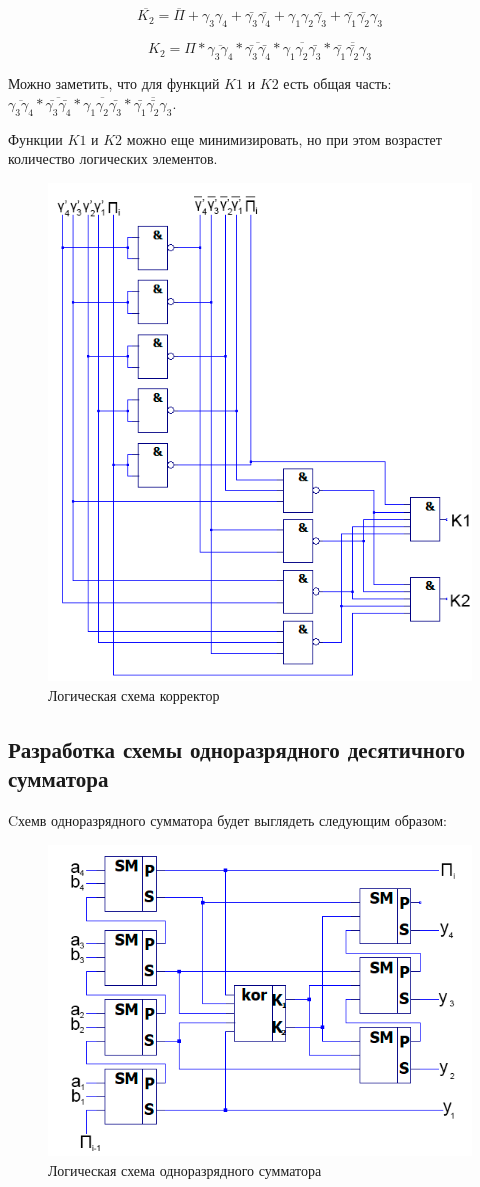 \documentclass[a4paper,14pt]{article}
\begin{document}
$$\overline{K_2} = \overline{\Pi} + \gamma_3 \gamma_4 + \bar{\gamma_3} \bar{\gamma_4} + \gamma_1 \gamma_2 \bar{\gamma_3} + \bar{\gamma_1} \bar{\gamma_2} \gamma_3$$

$$K_2 = \Pi * \overline{\gamma_3 \gamma_4} * \overline{\bar{\gamma_3} \bar{\gamma_4}} * \overline{\gamma_1 \gamma_2 \bar{\gamma_3}} * \overline{\bar{\gamma_1} \bar{\gamma_2} \gamma_3}$$

Можно заметить, что для функций $K1$ и $K2$ есть общая часть: $ \overline{\gamma_3 \gamma_4} * \overline{\bar{\gamma_3} \bar{\gamma_4}} * \overline{\gamma_1 \gamma_2 \bar{\gamma_3}} * \overline{\bar{\gamma_1} \bar{\gamma_2} \gamma_3}$.

Функции $K1$ и $K2$ можно еще минимизировать, но при этом возрастет количество логических элементов.

\begin{figure}[H]
	\centering
	\includegraphics[width=0.5\linewidth]{images/korr_sh_2}
	\caption{Логическая схема корректор}
	\label{fig:korr_sh}
\end{figure}

\subsection{Разработка схемы одноразрядного десятичного сумматора}

Cхемв одноразрядного сумматора будет выглядеть следующим образом:

\begin{figure}[H]
	\centering
	\includegraphics[width=0.5\linewidth]{images/odnSum_sh}
	\caption{Логическая схема одноразрядного сумматора}
	\label{fig:odnSum_sh}
\end{figure}
\end{document}
